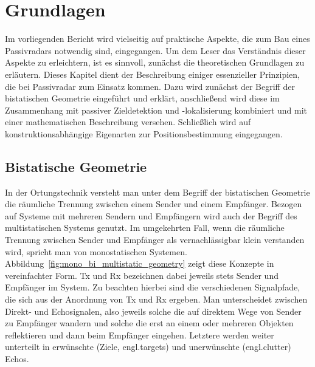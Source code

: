 \chapter{Grundlagen}\label{chp:theory_of_operation}

Im vorliegenden Bericht wird vielseitig auf praktische Aspekte, die zum Bau eines Passivradars notwendig sind, eingegangen. Um dem Leser das Verständnis dieser Aspekte zu erleichtern, ist es sinnvoll, zunächst die theoretischen Grundlagen zu erläutern. Dieses Kapitel dient der Beschreibung einiger essenzieller Prinzipien, die bei Passivradar zum Einsatz kommen. Dazu wird zunächst der Begriff der bistatischen Geometrie eingeführt und erklärt, anschließend wird diese im Zusammenhang mit passiver Zieldetektion und -lokalisierung kombiniert und mit einer mathematischen Beschreibung versehen. Schließlich wird auf konstruktionsabhängige Eigenarten zur Positionsbestimmung eingegangen.

\section{Bistatische Geometrie}\label{sct:bistatic_geometry}

In der Ortungstechnik versteht man unter dem Begriff der bistatischen Geometrie die räumliche Trennung zwischen einem Sender und einem Empfänger. Bezogen auf Systeme mit mehreren Sendern und Empfängern wird auch der Begriff des multistatischen Systems genutzt. Im umgekehrten Fall, wenn die räumliche Trennung zwischen Sender und Empfänger als vernachlässigbar klein verstanden wird, spricht man von monostatischen Systemen. Abbildung~\ref{fig:mono_bi_multistatic_geometry} zeigt diese Konzepte in vereinfachter Form. Tx und Rx bezeichnen dabei jeweils stets Sender und Empfänger im System. Zu beachten hierbei sind die verschiedenen Signalpfade, die sich aus der Anordnung von Tx und Rx ergeben. Man unterscheidet zwischen Direkt- und Echosignalen, also jeweils solche die auf direktem Wege von Sender zu Empfänger wandern und solche die erst an einem oder mehreren Objekten reflektieren und dann beim Empfänger eingehen. Letztere werden weiter unterteilt in erwünschte (Ziele, engl.\@ targets) und unerwünschte (engl.\@ clutter) Echos.

